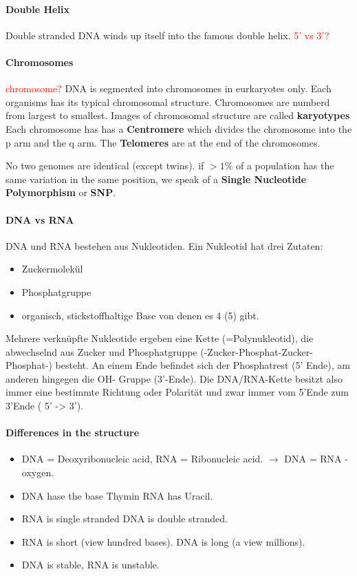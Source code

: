 \documentclass[10pt,a4paper]{article}
\begin{document}
\paragraph{Double Helix}
Double stranded DNA winds up itself into the famous double helix.
\textcolor{red}{5' vs 3'?}


\paragraph{Chromosomes}
\textcolor{red}{chromosome?}
DNA is segmented into chromosomes in eurkaryotes only. Each organisms has its typical chromosomal structure. Chromosomes are numberd from largest to smallest. Images of chromosomal structure are called \textbf{karyotypes}
Each chromosome has has a \textbf{Centromere} which divides the chromosome into the p arm and the q arm.
The \textbf{Telomeres} are at the end of the chromosomes.

No two genomes are identical (except twins). if $ > 1 \% $  of a population has the same variation in the same position, we speak of a \textbf{Single Nucleotide Polymorphism} or \textbf{SNP}.

\paragraph{DNA vs RNA}
DNA und RNA bestehen aus Nukleotiden. Ein Nukleotid hat drei Zutaten:
\begin{itemize}
\item Zuckermolekül
\item Phosphatgruppe
\item organisch, stickstoffhaltige Base von denen es 4 (5) gibt.
\end{itemize}
Mehrere verknüpfte Nukleotide ergeben eine Kette (=Polynukleotid), die abwechselnd aus Zucker und Phosphatgruppe (-Zucker-Phosphat-Zucker-Phosphat-) besteht. 
An einem Ende befindet sich der Phosphatrest (5' Ende), am anderen hingegen die OH- Gruppe (3'-Ende). Die DNA/RNA-Kette besitzt also immer eine bestimmte Richtung oder Polarität und zwar immer vom 5'Ende zum 3'Ende ( 5' -> 3').

\paragraph{Differences in the structure}
\begin{itemize}
\item DNA = Deoxyribonucleic acid, RNA = Ribonucleic acid. $\rightarrow$ DNA = RNA - oxygen.
\item DNA hase the base Thymin RNA has Uracil.
\item RNA is single stranded DNA is double stranded.
\item RNA is short (view hundred bases). DNA is long (a view millions). 
\item DNA is stable, RNA is unstable.
\end{itemize}
\end{document}
